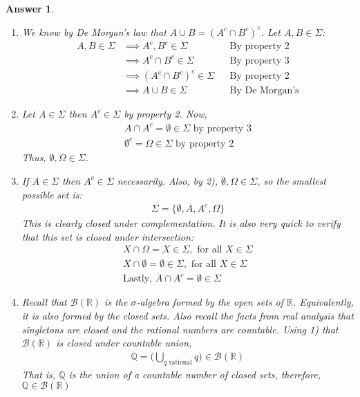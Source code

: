\documentclass[12pt]{article}
\theoremstyle{colon}
\newtheorem*{answer}{Answer}
\begin{document}
\begin{answer}
  \leavevmode
  \begin{enumerate}[label=\arabic*)]
    \item We know by De Morgan's law that $A \cup B = (A^c \cap B^c)^c$. Let $A, B \in \Sigma$:
      \begin{align*}
          A, B \in \Sigma &\implies A^c, B^c \in \Sigma && \text{By property 2}\\
          &\implies A^c \cap B^c \in \Sigma && \text{By property 3} \\
          &\implies (A^c \cap B^c)^c \in \Sigma && \text{By property 2} \\
          &\implies A \cup B \in \Sigma  && \text{By De Morgan's}
      \end{align*}
    \item Let $A \in \Sigma$ then $A^c \in \Sigma$ by property 2. Now,
      \begin{gather*}
        A \cap A^c = \emptyset \in \Sigma \text{ by property 3} \\
        \emptyset^c = \Omega \in \Sigma \text{ by property 2}
      \end{gather*}
      Thus, $\emptyset, \Omega \in \Sigma$.
    \item If $A \in \Sigma$ then $A^c \in \Sigma$ necessarily. Also, by 2), $\emptyset, \Omega \in \Sigma$, so the smallest possible set is:
      \begin{gather*}
        \Sigma = \{ \emptyset, A, A^c, \Omega \}
      \end{gather*}
      This is clearly closed under complementation. It is also very quick to verify that this set is closed under intersection:
      \begin{gather*}
        X \cap \Omega = X \in \Sigma, \text{ for all } X \in \Sigma \\
        X \cap \emptyset = \emptyset \in \Sigma, \text{ for all } X \in \Sigma \\
        \text{Lastly, } A \cap A^c = \emptyset \in \Sigma
      \end{gather*}
    \item Recall that $\mathcal{B}(\mathbb{R})$ is the $\sigma$-algebra formed by the open sets of $\mathbb{R}$. Equivalently, it is also formed by the closed sets. Also recall the facts from real analysis that singletons are closed and the rational numbers are countable. Using 1) that $\mathcal{B}(\mathbb{R})$ is closed under countable union,
      \begin{gather*}
        \mathbb{Q} = \big( \bigcup_{q \text{ rational}} q \big) \in \mathcal{B}(\mathbb{R})
      \end{gather*}
      That is, $\mathbb{Q}$ is the union of a countable number of closed sets, therefore, $\mathbb{Q} \in \mathcal{B}(\mathbb{R})$
  \end{enumerate}
\end{answer}
\end{document}
